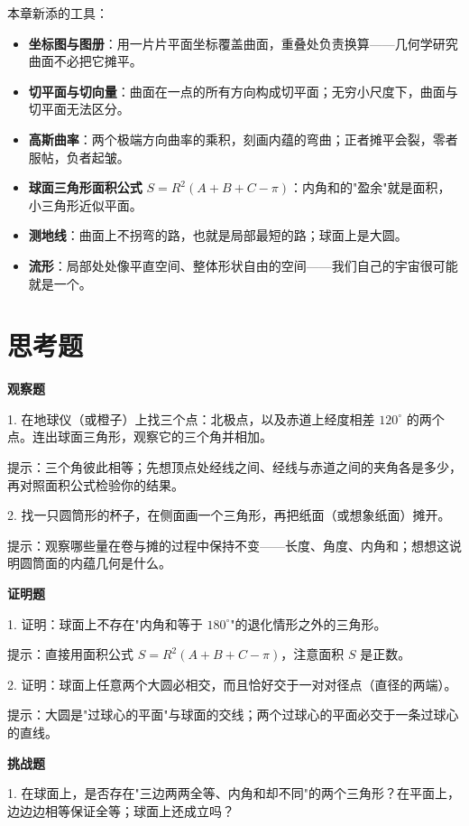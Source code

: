 \begin{toolbox}
本章新添的工具：

\begin{itemize}
  \item \textbf{坐标图与图册}：用一片片平面坐标覆盖曲面，重叠处负责换算——几何学研究曲面不必把它摊平。
  \item \textbf{切平面与切向量}：曲面在一点的所有方向构成切平面；无穷小尺度下，曲面与切平面无法区分。
  \item \textbf{高斯曲率}：两个极端方向曲率的乘积，刻画内蕴的弯曲；正者摊平会裂，零者服帖，负者起皱。
  \item \textbf{球面三角形面积公式} $S=R^2(A+B+C-\pi)$：内角和的"盈余"就是面积，小三角形近似平面。
  \item \textbf{测地线}：曲面上不拐弯的路，也就是局部最短的路；球面上是大圆。
  \item \textbf{流形}：局部处处像平直空间、整体形状自由的空间——我们自己的宇宙很可能就是一个。
\end{itemize}
\end{toolbox}

\section*{思考题}

\textbf{观察题}

1. 在地球仪（或橙子）上找三个点：北极点，以及赤道上经度相差 $120^\circ$ 的两个点。连出球面三角形，观察它的三个角并相加。

提示：三个角彼此相等；先想顶点处经线之间、经线与赤道之间的夹角各是多少，再对照面积公式检验你的结果。

2. 找一只圆筒形的杯子，在侧面画一个三角形，再把纸面（或想象纸面）摊开。

提示：观察哪些量在卷与摊的过程中保持不变——长度、角度、内角和；想想这说明圆筒面的内蕴几何是什么。

\textbf{证明题}

1. 证明：球面上不存在"内角和等于 $180^\circ$"的退化情形之外的三角形。

提示：直接用面积公式 $S=R^2(A+B+C-\pi)$，注意面积 $S$ 是正数。

2. 证明：球面上任意两个大圆必相交，而且恰好交于一对对径点（直径的两端）。

提示：大圆是"过球心的平面"与球面的交线；两个过球心的平面必交于一条过球心的直线。

\textbf{挑战题}

1. 在球面上，是否存在"三边两两全等、内角和却不同"的两个三角形？在平面上，边边边相等保证全等；球面上还成立吗？

